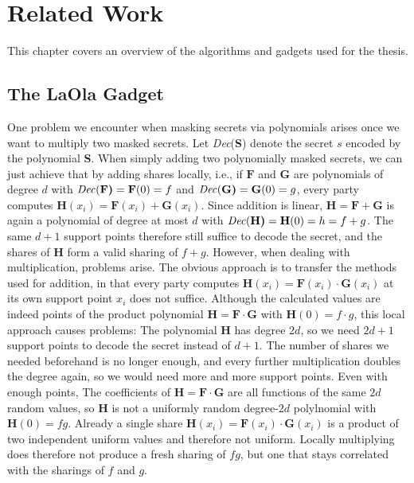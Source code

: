 \documentclass[english, version-2020-11]{uzl-thesis}
\newcommand{\ie}[0]{i.e.,\xspace}
\begin{document}
\chapter{Related Work}
This chapter covers an overview of the algorithms and gadgets used for the thesis. 
  \section{The LaOla Gadget}
  One problem we encounter when masking secrets via polynomials arises once we want to multiply two masked secrets. Let \textit{Dec}(\textbf{S}) denote the secret $s$ encoded by the polynomial \textbf{S}. When simply adding two polynomially masked secrets, we can just achieve that by adding shares locally, \ie if $\mathbf{F}$ and $\mathbf{G}$ are polynomials of degree $d$ with $\text{\textit{Dec}(\textbf{F)}}=\mathbf{F}(0)=f$ and $\text{\textit{Dec}(\textbf{G)}}=\mathbf{G}(0)=g$, every party computes $\mathbf{H}(x_i) = \mathbf{F}(x_i) + \mathbf{G}(x_i)$. Since addition is linear, $\mathbf{H} = \mathbf{F} + \mathbf{G}$ is again a polynomial of degree at most $d$ with $\text{\textit{Dec}(\textbf{H)}}=\mathbf{H}(0) = h = f + g$. The same $d+1$ support points therefore still suffice to decode the secret, and the shares of $\mathbf{H}$ form a valid sharing of $f + g$.
  However, when dealing with multiplication, problems arise. The obvious approach is to transfer the methods used for addition, in that every party computes $\mathbf{H}(x_i) = \mathbf{F}(x_i) \cdot \mathbf{G}(x_i)$ at its own support point $x_i$ does not suffice. Although the calculated values are indeed points of the product polynomial $\mathbf{H} = \mathbf{F} \cdot \mathbf{G}$ with $\mathbf{H}(0) = f \cdot g$, this local approach causes problems: The polynomial $\mathbf{H}$ has degree $2d$, so we need $2d+1$ support points to decode the secret instead of $d+1$. The number of shares we needed beforehand is no longer enough, and every further multiplication doubles the degree again, so we would need more and more support points.
  Even with enough points, The coefficients of $\mathbf{H} = \mathbf{F} \cdot \mathbf{G}$ are all functions of the same $2d$ random values, so $\mathbf{H}$ is not a uniformly random degree-$2d$ polylnomial with $\mathbf{H}(0) = fg$. Already a single share $\mathbf{H}(x_i) = \mathbf{F}(x_i) \cdot \mathbf{G}(x_i)$ is a product of two independent uniform values and therefore not uniform. Locally multiplying does therefore not produce a fresh sharing of $fg$, but one that stays correlated with the sharings of $f$ and $g$.
\end{document}
